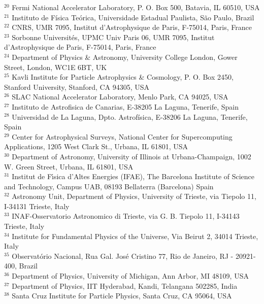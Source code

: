 \documentclass[fleqn,usenatbib]{mnras}
\begin{document}
{$^{20}$ Fermi National Accelerator Laboratory, P. O. Box 500, Batavia, IL 60510, USA\\
$^{21}$ Instituto de F\'{i}sica Te\'orica, Universidade Estadual Paulista, S\~ao Paulo, Brazil\\
$^{22}$ CNRS, UMR 7095, Institut d'Astrophysique de Paris, F-75014, Paris, France\\
$^{23}$ Sorbonne Universit\'es, UPMC Univ Paris 06, UMR 7095, Institut d'Astrophysique de Paris, F-75014, Paris, France\\
$^{24}$ Department of Physics \& Astronomy, University College London, Gower Street, London, WC1E 6BT, UK\\
$^{25}$ Kavli Institute for Particle Astrophysics \& Cosmology, P. O. Box 2450, Stanford University, Stanford, CA 94305, USA\\
$^{26}$ SLAC National Accelerator Laboratory, Menlo Park, CA 94025, USA\\
$^{27}$ Instituto de Astrofisica de Canarias, E-38205 La Laguna, Tenerife, Spain\\
$^{28}$ Universidad de La Laguna, Dpto. Astrofísica, E-38206 La Laguna, Tenerife, Spain\\
$^{29}$ Center for Astrophysical Surveys, National Center for Supercomputing Applications, 1205 West Clark St., Urbana, IL 61801, USA\\
$^{30}$ Department of Astronomy, University of Illinois at Urbana-Champaign, 1002 W. Green Street, Urbana, IL 61801, USA\\
$^{31}$ Institut de F\'{\i}sica d'Altes Energies (IFAE), The Barcelona Institute of Science and Technology, Campus UAB, 08193 Bellaterra (Barcelona) Spain\\
$^{32}$ Astronomy Unit, Department of Physics, University of Trieste, via Tiepolo 11, I-34131 Trieste, Italy\\
$^{33}$ INAF-Osservatorio Astronomico di Trieste, via G. B. Tiepolo 11, I-34143 Trieste, Italy\\
$^{34}$ Institute for Fundamental Physics of the Universe, Via Beirut 2, 34014 Trieste, Italy\\
$^{35}$ Observat\'orio Nacional, Rua Gal. Jos\'e Cristino 77, Rio de Janeiro, RJ - 20921-400, Brazil\\
$^{36}$ Department of Physics, University of Michigan, Ann Arbor, MI 48109, USA\\
$^{37}$ Department of Physics, IIT Hyderabad, Kandi, Telangana 502285, India\\
$^{38}$ Santa Cruz Institute for Particle Physics, Santa Cruz, CA 95064, USA\\
}
\end{document}
